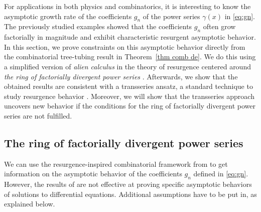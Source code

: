 \documentclass[oneside]{amsart}
\theoremstyle{definition}
\begin{document}
For applications in both physics and combinatorics, it is interesting to know the asymptotic growth rate of the coefficients $g_n$ of the power series $\gamma(x)$ in \eqref{eq:gn}. The previously studied examples \cite{bkerfc,bk30,BD,BDM} showed that the coefficients $g_n$ often grow factorially in magnitude and exhibit characteristic resurgent asymptotic behavior. In this section, we prove constraints on this asymptotic behavior directly from the combinatorial tree-tubing result in Theorem~\ref{thm comb de}. We do this using a simplified version of \emph{alien calculus} in the theory of resurgence \cite{ecalle,MR3526111} centered around \emph{the ring of factorially divergent power series} \cite{Bgenfun}. Afterwards, we show that the obtained results are consistent with a transseries ansatz, a standard technique to study resurgence behavior \cite{costinDMJ}. Moreover, we will show that the transseries approach uncovers new behavior if the conditions for the ring of factorially divergent power series are not fulfilled.

%

\subsection{The ring of factorially divergent power series}
\label{ring}

We can use the resurgence-inspired combinatorial framework from \cite{Bgenfun} to get information on the asymptotic behavior of the coefficients $g_n$ defined in \eqref{eq:gn}. However, the results of \cite{Bgenfun} are not effective at proving specific asymptotic behaviors of solutions to differential equations. Additional assumptions have to be put in, as explained below. 
\end{document}
